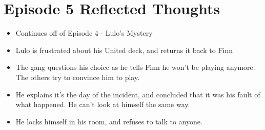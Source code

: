 \documentclass[12pt, letterpaper]{article}
\begin{document}
\section*{Episode 5 Reflected Thoughts}
\begin{itemize}
    \item Continues off of Episode 4 - Lulo’s Mystery
    \item Lulo is frustrated about his United deck, and returns it back to Finn
    \item The gang questions his choice as he tells Finn he won’t be playing anymore. The others try to convince him to play.
    \item He explains it’s the day of the incident, and concluded that it was his fault of what happened. He can’t look at himself the same way.
    \item He locks himself in his room, and refuses to talk to anyone.
\end{itemize}
\end{document}
